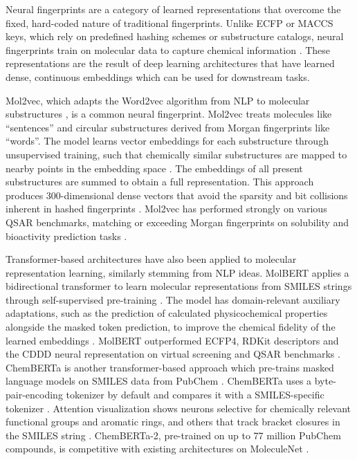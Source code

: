 Neural fingerprints are a category of learned  representations that overcome the fixed, hard-coded nature of traditional fingerprints. Unlike ECFP or MACCS keys, which rely on predefined hashing schemes or substructure catalogs, neural fingerprints train on molecular data to capture chemical information \citep{Jaeger2018, Chithrananda2020}. These representations are the result of deep learning architectures that have learned dense, continuous embeddings which can be used for downstream tasks. 

Mol2vec, which adapts the Word2vec algorithm from NLP to molecular substructures \citep{Jaeger2018}, is a common neural fingerprint. Mol2vec treats molecules like ``sentences'' and circular substructures derived from Morgan fingerprints like ``words''. The model learns vector embeddings for each substructure through unsupervised training, such that chemically similar substructures are mapped to nearby points in the embedding space \citep{Jaeger2018}. The embeddings of all present substructures are summed to obtain a full representation. This approach produces 300-dimensional dense vectors that avoid the sparsity and bit collisions inherent in hashed fingerprints \citep{Jaeger2018}. Mol2vec has performed strongly on various QSAR benchmarks, matching or exceeding Morgan fingerprints on solubility and bioactivity prediction tasks \citep{Jaeger2018}.

Transformer-based architectures have also been applied to molecular representation learning, similarly stemming from NLP ideas. MolBERT applies a bidirectional transformer to learn molecular representations from SMILES strings through self-supervised pre-training \citep{Fabian2020}. The model has domain-relevant auxiliary adaptations, such as the prediction of calculated physicochemical properties alongside the masked token prediction, to improve the chemical fidelity of the learned embeddings \citep{Fabian2020}. MolBERT outperformed ECFP4, RDKit descriptors and the CDDD neural representation on virtual screening and QSAR benchmarks \citep{Fabian2020}. ChemBERTa is another transformer-based approach which pre-trains masked language models on SMILES data from PubChem \citep{Chithrananda2020}.  ChemBERTa uses a byte-pair-encoding tokenizer by default and compares it with a SMILES-specific tokenizer \citep{Chithrananda2020}. Attention visualization shows neurons selective for chemically relevant functional groups and aromatic rings, and others that track bracket closures in the SMILES string \citep{Chithrananda2020}. ChemBERTa-2, pre-trained on up to 77 million PubChem compounds, is competitive with existing architectures on MoleculeNet \citep{Ahmad2022}.

